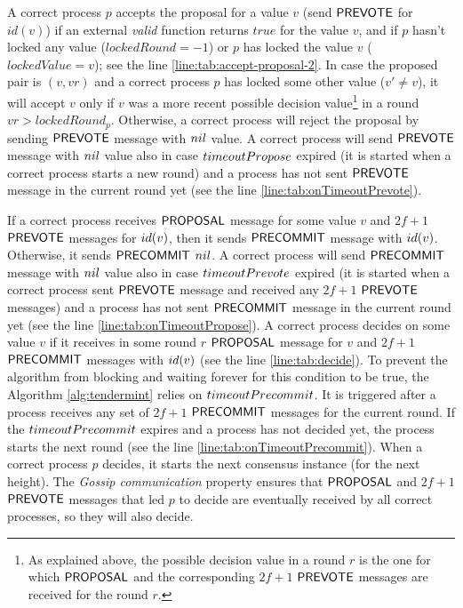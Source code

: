 A correct process $p$ accepts the proposal for a value $v$  (send $\mathsf{PREVOTE}$
for $id(v)$) if an external \emph{valid} function returns $true$ for the value
$v$, and if $p$ hasn't locked any value ($lockedRound = -1$) or $p$ has locked
the value $v$ ($lockedValue = v$); see the line
\ref{line:tab:accept-proposal-2}.  In case the proposed pair is $(v,vr)$ and a
correct process $p$ has locked some other value ($v' \neq v$), it will accept
$v$ only if $v$ was a more recent possible decision value\footnote{As
explained above, the possible decision value in a round $r$ is the one for
which $\mathsf{PROPOSAL}$ and the corresponding $2f+1$ $\mathsf{PREVOTE}$ messages are received
for the round $r$.} in a round $vr > lockedRound_p$.  Otherwise, a correct
process will reject the proposal by sending $\mathsf{PREVOTE}$ message with $nil$
value. A correct process will send $\mathsf{PREVOTE}$ message with $nil$ value also in
case $timeoutPropose$ expired (it is started when a correct process starts a
new round) and a process has not sent $\mathsf{PREVOTE}$ message in the current round
yet (see the line \ref{line:tab:onTimeoutPrevote}). 

If a correct process receives $\mathsf{PROPOSAL}$ message for some value $v$ and $2f+1$
$\mathsf{PREVOTE}$ messages for $id(v)$, then it sends $\mathsf{PRECOMMIT}$ message with
$id(v)$. Otherwise, it sends $\mathsf{PRECOMMIT}$ $nil$. A correct process will send
$\mathsf{PRECOMMIT}$ message with $nil$ value also in case $timeoutPrevote$ expired
(it is started when a correct process sent $\mathsf{PREVOTE}$ message and received any
$2f+1$ $\mathsf{PREVOTE}$ messages)  and a process has not sent $\mathsf{PRECOMMIT}$ message in
the current round yet (see the line \ref{line:tab:onTimeoutPropose}).  A
correct process decides on some value $v$ if it receives in some round $r$
$\mathsf{PROPOSAL}$ message for $v$ and $2f+1$ $\mathsf{PRECOMMIT}$ messages with $id(v)$ (see
the line \ref{line:tab:decide}).  To prevent the algorithm from blocking and
waiting forever for this condition to be true, the Algorithm
\ref{alg:tendermint} relies on $timeoutPrecommit$. It is triggered after a
process receives any set of $2f+1$ $\mathsf{PRECOMMIT}$ messages for the current round.
If the $timeoutPrecommit$ expires and a process has not decided yet, the
process starts the next round (see the line \ref{line:tab:onTimeoutPrecommit}).
When a correct process $p$ decides, it starts the next consensus instance 
(for the next height). The \emph{Gossip communication} property ensures 
that $\mathsf{PROPOSAL}$ and $2f+1$ $\mathsf{PREVOTE}$ messages that led $p$ to decide 
are eventually received by all correct processes, so they will also decide. 

